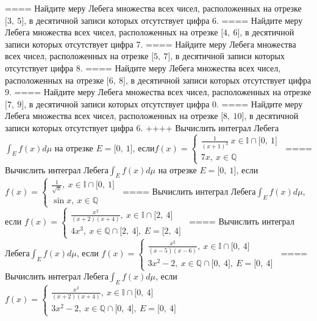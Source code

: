 ====
Найдите меру Лебега множества всех чисел, расположенных на отрезке \(\lbrack 3,\ 5\rbrack\), в десятичной записи которых отсутствует цифра 6.
====
Найдите меру Лебега множества всех чисел, расположенных на отрезке \(\lbrack 4,\ 6\rbrack\), в десятичной записи которых отсутствует цифра 7.
====
Найдите меру Лебега множества всех чисел, расположенных на отрезке \(\lbrack 5,\ 7\rbrack\), в десятичной записи которых отсутствует цифра 8.
====
Найдите меру Лебега множества всех чисел, расположенных на отрезке \(\lbrack 6,\ 8\rbrack\), в десятичной записи которых отсутствует цифра 9.
====
Найдите меру Лебега множества всех чисел, расположенных на отрезке \(\lbrack 7,\ 9\rbrack\), в десятичной записи которых отсутствует цифра 0.
====
Найдите меру Лебега множества всех чисел, расположенных на отрезке \(\lbrack 8,\ 10\rbrack\), в десятичной записи которых отсутствует цифра 6.
++++
Вычислить интеграл Лебега\(\int_{E}^{}f(x)d\mu\) на отрезке \(E = \lbrack 0,\ 1\rbrack\), если\(f(x) = \left\{ \begin{matrix}
\frac{1}{(x + 1)^{3}}\ x \in \mathbb{I} \cap \lbrack 0,\ 1\rbrack \\
7x,\ x\mathbb{\in Q}
\end{matrix} \right.\ \)
====
Вычислить интеграл Лебега\(\int_{E}^{}f(x)d\mu\) на отрезке \(E = \lbrack 0,\ 1\rbrack\), если\(f(x) = \left\{ \begin{matrix}
\frac{1}{\sqrt{x}},\ x \in \mathbb{I} \cap \lbrack 0,\ 1\rbrack \\
\sin x,\ x\mathbb{\in Q}
\end{matrix} \right.\ \)
====
Вычислить интеграл Лебега\(\int_{E}^{}f(x)d\mu\), если \(f(x) = \left\{ \begin{matrix}
\frac{x^{2}}{(x + 2)(x + 4)},\ x \in \mathbb{I} \cap \lbrack 2,\ 4\rbrack \\
4x^{3},\ x\mathbb{\in Q \cap}\lbrack 2,\ 4\rbrack,\ E = \lbrack 2,\ 4\rbrack
\end{matrix} \right.\ \)
====
Вычислить интеграл Лебега\(\int_{E}^{}f(x)d\mu\), если \(f(x) = \left\{ \begin{matrix}
\frac{x^{2}}{(x - 5)(x - 6)},\ x \in \mathbb{I} \cap \lbrack 0,\ 4\rbrack \\
3x^{2} - 2,\ x\mathbb{\in Q \cap}\lbrack 0,\ 4\rbrack,\ E = \lbrack 0,\ 4\rbrack
\end{matrix} \right.\ \)
====
Вычислить интеграл Лебега\(\int_{E}^{}f(x)d\mu\), если \(f(x) = \left\{ \begin{matrix}
\frac{x^{2}}{(x + 2)(x + 4)},\ x \in \mathbb{I} \cap \lbrack 0,\ 4\rbrack \\
3x^{2} - 2,\ x\mathbb{\in Q \cap}\lbrack 0,\ 4\rbrack,\ E = \lbrack 0,\ 4\rbrack
\end{matrix} \right.\ \)
